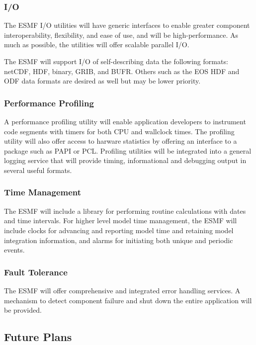 \subsubsection{I/O}

The ESMF I/O utilities will have generic interfaces to enable greater
component interoperability, flexibility, and ease of use, and will be 
high-performance.  As much as possible, the utilities will offer scalable 
parallel I/O.

The ESMF will support I/O of self-describing data the following formats:
netCDF, HDF, binary, GRIB, and BUFR.  Others such as the EOS HDF and ODF 
data formats are desired as well but may be lower priority.

\subsubsection{Performance Profiling}

A performance profiling utility will enable application developers to 
instrument code segments with timers for both CPU and wallclock 
times.  The profiling utility will also offer access to harware statistics 
by offering an interface to a package such as PAPI or PCL.  Profiling
utilities will be integrated into a general logging service that will 
provide timing, informational and debugging output in several useful formats.

\subsubsection{Time Management}

The ESMF will include a library for performing routine 
calculations with dates and time intervals.  For higher level model
time management, the ESMF will include clocks for advancing and 
reporting model time and retaining model integration information, 
and alarms for initiating both unique and periodic events.

\subsubsection{Fault Tolerance}

The ESMF will offer comprehensive and integrated error handling services.  
A mechanism to detect component failure and shut down the entire 
application will be provided.

\subsection{Future Plans}

